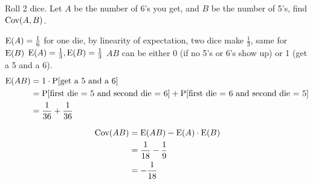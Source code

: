 \question Roll 2 dice. Let $A$ be the number of 6's you get, and $B$ 
be the number of 5's, find $\text{Cov}(A, B)$.
\begin{solution}[1cm]
$\text{E}(A) = \frac{1}{6}$ for one die, by linearity of expectation, two dice 
make $\frac{1}{3}$, same for $\text{E}(B)$
$\text{E}(A) = \frac{1}{3}, \text{E}(B) = \frac{1}{3}$ \newline
$AB$ can be either 0 (if no 5's or 6's show up) or 1 (get a 5 and a 6).
\begin{equation}
\begin{split}
\text{E}(AB) &= 1 \cdot \text{P}[\text{get a 5 and a 6}] \\ \nonumber
 &= \text{P}[\text{first die = 5 and second die = 6}] + \text{P}[\text{first die = 
 6 and second die = 5}]  \\ 
 &= \frac{1}{36} + \frac{1}{36}
\end{split}
\end{equation} 

 
\begin{equation}
\begin{split}
\text{Cov} (AB) &=  \text{E}(AB) - \text{E}(A) \cdot  \text{E}(B) \\ \nonumber
&= \frac{1}{18} - \frac{1}{9} \\
&= -\frac{1}{18}
\end{split}
\end{equation}
\end{solution}